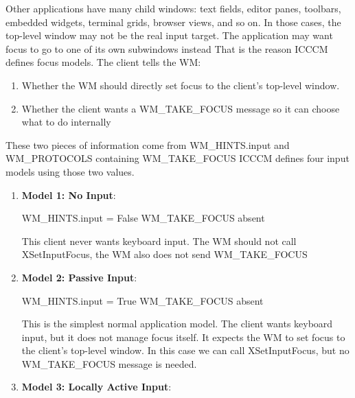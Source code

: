 \documentclass{report}
\begin{document}
\begin{itemize}
            \bigbreak \noindent 
            Other applications have many child windows: text fields, editor panes, toolbars, embedded widgets, terminal grids, browser views, and so on. In those cases, the top-level window may not be the real input target. The application may want focus to go to one of its own subwindows instead
            \bigbreak \noindent 
            That is the reason ICCCM defines focus models. The client tells the WM:
            \begin{enumerate}
                \item Whether the WM should directly set focus to the client’s top-level window.
                \item Whether the client wants a WM\_TAKE\_FOCUS message so it can choose what to do internally
            \end{enumerate}
            These two pieces of information come from WM\_HINTS.input and WM\_PROTOCOLS containing WM\_TAKE\_FOCUS
            \bigbreak \noindent 
            ICCCM defines four input models using those two values.
            \begin{enumerate}
                \item \textbf{Model 1: No Input}:
                    \bigbreak \noindent 
                    \begin{cppcode}
                    WM_HINTS.input = False
                    WM_TAKE_FOCUS absent
                    \end{cppcode}
                    \bigbreak \noindent 
                    This client never wants keyboard input. The WM should not call XSetInputFocus, the WM also does not send WM\_TAKE\_FOCUS
                \item \textbf{Model 2: Passive Input}: 
                    \bigbreak \noindent 
                    \begin{cppcode}
                        WM_HINTS.input = True
                        WM_TAKE_FOCUS absent
                    \end{cppcode}
                    \bigbreak \noindent 
                    This is the simplest normal application model. The client wants keyboard input, but it does not manage focus itself. It expects the WM to set focus to the client’s top-level window.
                    \bigbreak \noindent 
                    In this case we can call XSetInputFocus, but no WM\_TAKE\_FOCUS message is needed.
                \item \textbf{Model 3: Locally Active Input}: 
                    \begin{cppcode}

\end{cppcode}
\end{enumerate}
\end{itemize}
\end{document}
